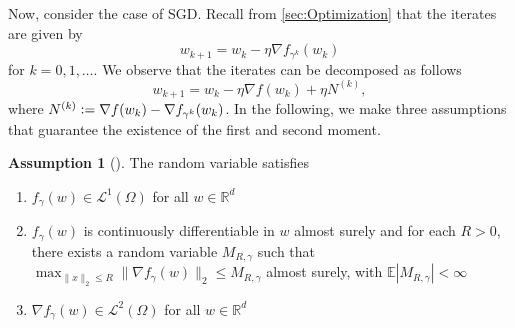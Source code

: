 \documentclass[12pt]{article}
\theoremstyle{definition}
\newtheorem{assumption}[assumption]{Assumption}
\numberwithin{equation}{section}
\newcommand{\norm}[1]{\lVert{#1}\rVert_2}
\newcommand{\defeq}{\vcentcolon=}
\begin{document}
Now, consider the case of SGD. Recall from \autoref{sec:Optimization} that the iterates are given by
\begin{equation*}
  w_{k+1} = w_{k} - \eta \nabla f_{\gamma^k}(w_{k})
\end{equation*}
for $k = 0,1,\dots$. We observe that the iterates can be decomposed as follows
\begin{equation}
  \label{eq:sgd_decomposition}
  w_{k+1} = w_{k} - \eta \nabla f(w_{k}) + \eta N^{(k)},
\end{equation}
where $N^{(k)} \defeq \nabla f(w_{k}) - \nabla f_{\gamma^k}(w_{k})$.
In the following, we make three assumptions that guarantee the existence of the first and second moment.
\begin{assumption}[]
  \label{as:sde_model}
  The random variable satisfies 
  \begin{enumerate}[label=(\roman*)]
    \item $f_{\gamma}(w) \in \mathcal{L}^1(\Omega)$ for all $w \in \mathbb{R}^d$
    \item \label{as:bounded_gradient} $f_{\gamma}(w)$ is continuously differentiable in $w$ almost surely and for each $R > 0$, there exists a random variable $M_{R,\gamma}$ such that $\max_{\norm{x} \leq R} \norm{ \nabla f_{\gamma}(w) } \leq M_{R,\gamma}$ almost surely, with $\mathbb{E} |M_{R,\gamma}| < \infty$
    \item $\nabla f_{\gamma}(w) \in \mathcal{L}^2(\Omega)$ for all $w \in \mathbb{R}^d$
  \end{enumerate}
\end{assumption}
\end{document}
